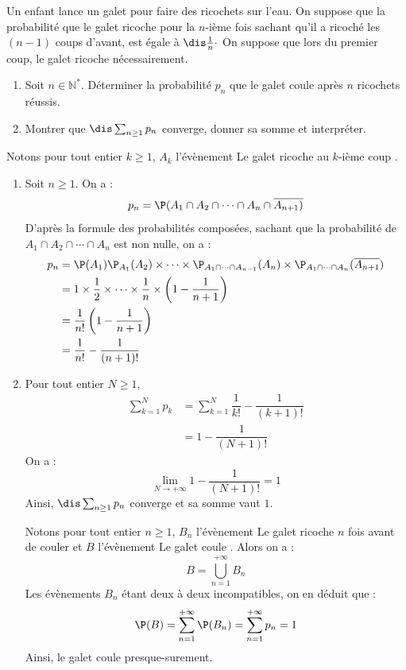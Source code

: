 \documentclass[a4paper,10pt]{report}
\begin{document}
\begin{Exercice}{} Un enfant lance un galet pour faire des ricochets sur l'eau. On suppose que la probabilité que le galet ricoche pour la $n$-ième fois sachant qu'il a ricoché les $(n-1)$ coups d'avant, est égale à $\dis \frac{1}{n}\cdot$ On suppose que lors du premier coup, le galet ricoche nécessairement.
\begin{enumerate}
\item Soit $n \in \mathbb{N}^*$. Déterminer la probabilité $p_n$ que le galet coule après $n$ ricochets réussis.
\item Montrer que $\dis \sum_{n \geq 1} p_n$ converge, donner sa somme et interpréter.
\end{enumerate}
\end{Exercice}

\corr Notons pour tout entier $k \geq 1$, $A_k$ l'évènement \og Le galet ricoche au $k$-ième coup \fg.

\begin{enumerate}
\item Soit $n \geq 1$. On a :
$$ p_n = \P(A_1 \cap A_2 \cap \cdots \cap A_n \cap \overline{A_{n+1})}$$
D'après la formule des probabilités composées, sachant que la probabilité de $A_1 \cap A_2 \cap \cdots \cap A_n $ est non nulle, on a :
\begin{align*}
p_n & = \P(A_1) \P_{A_1}(A_2) \times \cdots \times \P_{A_1 \cap \cdots \cap A_{n-1}}(A_n) \times \P_{A_1 \cap \cdots \cap A_{n}}(\overline{A_{n+1}}) \\
& = 1 \times \dfrac{1}{2} \times \cdots \times \dfrac{1}{n} \times \left(1- \dfrac{1}{n+1} \right) \\
& = \dfrac{1}{n!} \left(1- \dfrac{1}{n+1} \right) \\
& = \dfrac{1}{n!} - \dfrac{1}{(n+1)!}
\end{align*}
\item Pour tout entier $N \geq 1$,
\begin{align*}
\sum_{k=1}^N p_k & = \sum_{k=1}^N \dfrac{1}{k!} - \dfrac{1}{(k+1)!} \\
& = 1- \dfrac{1}{(N+1)!}
\end{align*}
On a :
$$ \lim_{N \rightarrow + \infty}  1- \dfrac{1}{(N+1)!} = 1$$
Ainsi, $\dis \sum_{n \geq 1} p_n$ converge et sa somme vaut $1$.

\medskip

\noindent Notons pour tout entier $n \geq 1$, $B_n$ l'évènement \og Le galet ricoche $n$ fois avant de couler \fg et $B$ l'évènement \og Le galet coule \fg{}. Alors on a :
$$ B = \bigcup_{n=1}^{+ \infty} B_n$$
Les évènements $B_n$ étant deux à deux incompatibles, on en déduit que :
$$ \P(B) = \sum_{n=1}^{+ \infty} \P(B_n) =  \sum_{n=1}^{+ \infty} p_n = 1$$
Ainsi, le galet coule presque-surement.
\end{enumerate}
\end{document}
